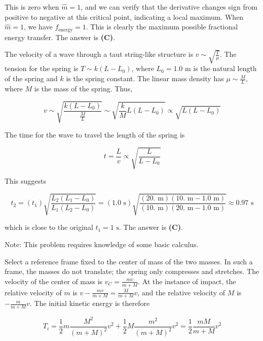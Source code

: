 \documentclass[12pt]{article}
\begin{document}
This is zero when $\hat{m} = 1$, and we can verify that the derivative changes sign from positive to negative at this critical point, indicating a local maximum. When $\hat{m} = 1$, we have $f_\text{energy} = 1$. This is clearly the maximum possible fractional energy transfer. The answer is \textbf{(C)}.


\vspace{2 \baselineskip}



The velocity of a wave through a taut string-like structure is $v \sim \sqrt{\frac{T}{\mu}}$. The tension for the spring is $T \sim k (L - L_0)$, where $L_0 = 1.0 \text{ m}$ is the natural length of the spring and $k$ is the spring constant. The linear mass density has $\mu \sim \frac{M}{L}$, where $M$ is the mass of the spring. Thus,

$$v \sim \sqrt{\frac{k (L - L_0)}{\frac{M}{L}}} \sim \sqrt{\frac{k}{M} L (L - L_0)} \propto \sqrt{L (L - L_0)}$$

The time for the wave to travel the length of the spring is

$$t = \frac{L}{v} \propto \sqrt{\frac{L}{L - L_0}}$$

This suggests

$$t_2 = (t_1) \sqrt{\frac{L_2 (L_1 - L_0)}{L_1 (L_2 - L_0)}} = (1.0 \text{ s}) \sqrt{\frac{(20. \text{ m}) (10. \text{ m} - 1.0 \text{ m})}{(10. \text{ m}) (20. \text{ m} - 1.0 \text{ m})}} \approx 0.97 \text{ s}$$

which is close to the original $t_1 = 1 \text{ s}$. The answer is \textbf{(C)}.

Note: This problem requires knowledge of some basic calculus.


\vspace{2 \baselineskip}



Select a reference frame fixed to the center of mass of the two masses. In such a frame, the masses do not translate; the spring only compresses and stretches. The velocity of the center of mass is $v_C = \frac{m v}{m + M}$. At the instance of impact, the relative velocity of $m$ is $v - \frac{m v}{m + M} = \frac{M}{m + M} v$, and the relative velocity of $M$ is $-\frac{m}{m + M} v$. The initial kinetic energy is therefore

$$T_i = \frac{1}{2} m \frac{M^2}{(m + M)^2} v^2 + \frac{1}{2} M \frac{m^2}{(m + M)^2} v^2 = \frac{1}{2} \frac{m M}{m + M} v^2$$
\end{document}
